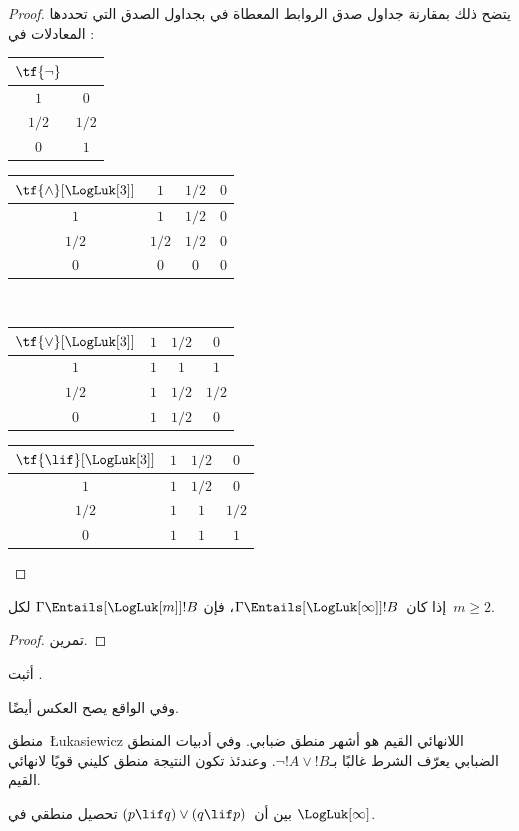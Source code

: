 \documentclass[../../../include/open-logic-section]{subfiles}
\begin{document}
\begin{proof}
  يتضح ذلك بمقارنة جداول صدق الروابط المعطاة في
   بجداول الصدق التي تحددها المعادلات
  في :
  \begin{center}
    \begin{tabular}{c|c}
      $\tf{\lnot}$ & \\
      \hline
      $1$ & $0$ \\
      $1/2$ & $1/2$ \\
      $0$ & $1$
    \end{tabular}
    \quad
    \begin{tabular}{c|ccc}
      $\tf{\land}[\LogLuk[3]]$ & $1$ & $1/2$ & $0$ \\
      \hline
      $1$ & $1$ & $1/2$ & $0$ \\
      $1/2$ & $1/2$ & $1/2$ & $0$\\
      $0$ & $0$ & $0$ & $0$
    \end{tabular}
    \\[2ex]
    \begin{tabular}{c|ccc}
      $\tf{\lor}[\LogLuk[3]]$ & $1$ & $1/2$ & $0$ \\
      \hline
      $1$ & $1$ & $1$ & $1$ \\
      $1/2$ & $1$ & $1/2$ & $1/2$ \\
      $0$ & $1$ & $1/2$ & $0$
    \end{tabular}
    \quad
    \begin{tabular}{c|ccc}
      $\tf{\lif}[\LogLuk[3]]$ & $1$ & $1/2$ & $0$ \\
      \hline
      $1$ & $1$ & $1/2$ & $0$ \\
      $1/2$ & $1$ & $1$ & $1/2$  \\
      $0$ & $1$ & $1$ & $1$
    \end{tabular}
  \end{center}
\end{proof}

\begin{prop}
  إذا كان~$\Gamma \Entails[\LogLuk[\infty]] !B$، فإن
  $\Gamma \Entails[\LogLuk[m]] !B$ لكل~$m \ge 2$.
\end{prop}

\begin{proof}
  تمرين.
\end{proof}

\begin{prob}
  أثبت .
\end{prob}

وفي الواقع يصح العكس أيضًا.

منطق~\L ukasiewicz اللانهائي القيم هو أشهر منطق ضبابي. وفي أدبيات
المنطق الضبابي يعرّف الشرط غالبًا بـ$\lnot !A \lor !B$. وعندئذ تكون
النتيجة منطق كليني قويًا لانهائي القيم.

\begin{prob}
  بين أن~$(p \lif q) \lor (q \lif p)$ تحصيل منطقي في
  $\LogLuk[\infty]$.
\end{prob}
\end{document}
